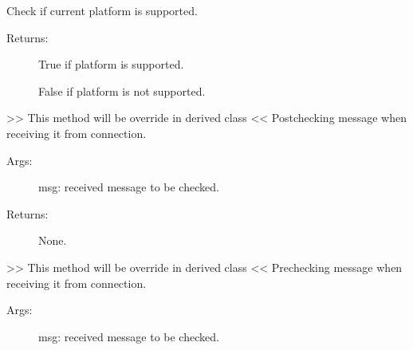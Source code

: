 \documentclass[letterpaper,10pt,english]{sphinxmanual}
\begin{document}
\begin{fulllineitems}
\begin{fulllineitems}
\label{\detokenize{QConnectBase:QConnectBase.connection_base.ConnectionBase.is_supported_platform}}
\sphinxAtStartPar
Check if current platform is supported.
\begin{description}
\item[{Returns:}] \leavevmode
\sphinxAtStartPar
True if platform is supported.

\sphinxAtStartPar
False if platform is not supported.

\end{description}

\end{fulllineitems}


\begin{fulllineitems}
\label{\detokenize{QConnectBase:QConnectBase.connection_base.ConnectionBase.post_msg_check}}
\sphinxAtStartPar
\textgreater{}\textgreater{} This method will be override in derived class \textless{}\textless{}
Post\sphinxhyphen{}checking message when receiving it from connection.
\begin{description}
\item[{Args:}] \leavevmode
\sphinxAtStartPar
msg: received message to be checked.

\item[{Returns:}] \leavevmode
\sphinxAtStartPar
None.

\end{description}

\end{fulllineitems}


\begin{fulllineitems}
\label{\detokenize{QConnectBase:QConnectBase.connection_base.ConnectionBase.pre_msg_check}}
\sphinxAtStartPar
\textgreater{}\textgreater{} This method will be override in derived class \textless{}\textless{}
Pre\sphinxhyphen{}checking message when receiving it from connection.
\begin{description}
\item[{Args:}] \leavevmode
\sphinxAtStartPar
msg: received message to be checked.


\end{description}
\end{fulllineitems}
\end{fulllineitems}
\end{document}
